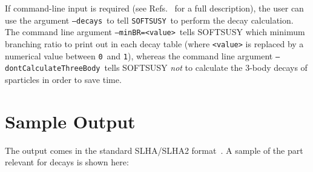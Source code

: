 \documentclass[final,3p,times,pdflatex]{elsarticle}
\def\SOFTSUSY{{\tt SOFTSUSY}}
\def\code#1{{\tt #1}}
\begin{document}
If command-line input is required (see
Refs.~\cite{Allanach:2001kg,Allanach:2013kza} 
for a full description), the user can use the argument 
\code{--decays}~to tell \SOFTSUSY~to perform the decay calculation. 
The command line argument \code{--minBR=<value>}~tells SOFTSUSY which minimum
branching ratio to print out in each decay table (where \code{<value>} is
replaced by a numerical value between \code{0}~and \code{1}), whereas the
command line argument \code{--dontCalculateThreeBody}~tells SOFTSUSY {\em
  not}\/ to calculate the 3-body decays of sparticles in order to save time. 

\section{Sample Output}
The output comes in the standard SLHA/SLHA2
format~\cite{Skands:2003cj,Allanach:2008qq}. A sample of the part relevant for
decays is shown here:
\end{document}
